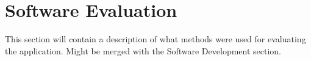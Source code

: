     \section{Software Evaluation} %
    This section will contain a description of what methods were used for evaluating the application. Might be merged with the Software Development section.


